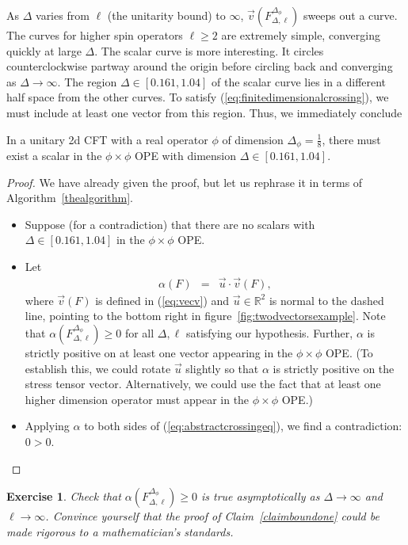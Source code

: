\documentclass{ws-rv9x6}
\newcommand\be{\begin{eqnarray}}
\newcommand\ee{\end{eqnarray}}
\newcommand\f\phi
\newcommand\<\langle
\renewcommand\>\rangle
\newcommand\R{\mathbb{R}}
\renewcommand\.{\cdot}
\newcommand\x\times
\newcommand\De{\Delta}
\newcommand\oo\infty
\newtheorem{exercise}{Exercise}[section]
\begin{document}
As $\De$ varies from $\ell$ (the unitarity bound) to $\oo$, $\vec v(F_{\De,\ell}^{\De_\f})$ sweeps out a curve.  The curves for higher spin operators $\ell\geq 2$ are extremely simple, converging quickly at large $\De$.  The scalar curve is more interesting. It circles counterclockwise partway around the origin before circling back and converging as $\De\to \oo$.  The region $\De\in[0.161,1.04]$ of the scalar curve lies in a different half space from the other curves.  To satisfy (\ref{eq:finitedimensionalcrossing}), we must include at least one vector from this region.  Thus, we immediately conclude
\begin{claim}
In a unitary 2d CFT with a real operator $\f$ of dimension $\De_\f=\frac 1 8$, there must exist a scalar in the $\f\x\f$ OPE with dimension $\De\in[0.161,1.04]$.
\label{claimboundone}
\end{claim}
\begin{proof}
We have already given the proof, but let us rephrase it in terms of Algorithm~\ref{thealgorithm}.
\begin{itemize}
\item Suppose (for a contradiction) that there are no scalars with $\De\in[0.161,1.04]$ in the $\f\x\f$ OPE.
\item Let
\be
\alpha(F) &=& \vec u \. \vec v(F),
\ee
where $\vec v(F)$ is defined in (\ref{eq:vecv}) and $\vec u\in \R^2$ is normal to the dashed line, pointing to the bottom right in figure~\ref{fig:twodvectorsexample}.  Note that $\alpha(F_{\De,\ell}^{\De_\f})\geq 0$ for all $\De,\ell$ satisfying our hypothesis.  Further, $\alpha$ is strictly positive on at least one vector appearing in the $\f\x\f$ OPE. (To establish this, we could rotate $\vec u$ slightly so that $\alpha$ is strictly positive on the stress tensor vector. Alternatively, we could use the fact that at least one higher dimension operator must appear in the $\f\x\f$ OPE.)
\item Applying $\alpha$ to both sides of (\ref{eq:abstractcrossingeq}), we find a contradiction: $0>0$.
\end{itemize}
\end{proof}

\begin{exercise}
\label{exercise:asymptotics}
Check that $\alpha(F_{\De,\ell}^{\De_\f})\geq 0$ is true asymptotically as $\De\to \oo$ and $\ell\to \oo$.  Convince yourself that the proof of Claim~\ref{claimboundone} could be made rigorous to a mathematician's standards.
\end{exercise}
\end{document}
